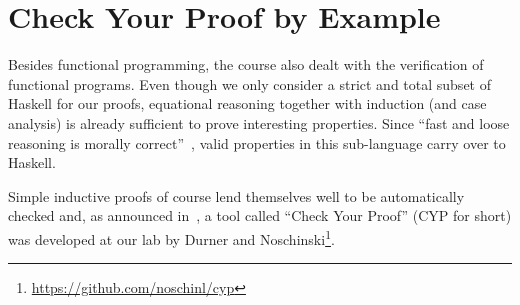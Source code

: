 \section{Check Your Proof by Example}\label{sec:cyp}
Besides functional programming,
the course also dealt with the verification of functional programs.
Even though we only consider a strict and total subset
of Haskell for our proofs,
equational reasoning together with induction
(and case analysis)
is already sufficient to prove interesting properties.
Since ``fast and loose reasoning is morally correct''~\cite{fast_and_loose},
valid properties in this sub-language carry over to Haskell.

Simple inductive proofs of course lend themselves well to be automatically checked and, as announced in~\cite{next_1100}, a tool called ``Check Your Proof'' (CYP for short) was developed at our lab by Durner and Noschinski\footnote{\url{https://github.com/noschinl/cyp}}.


